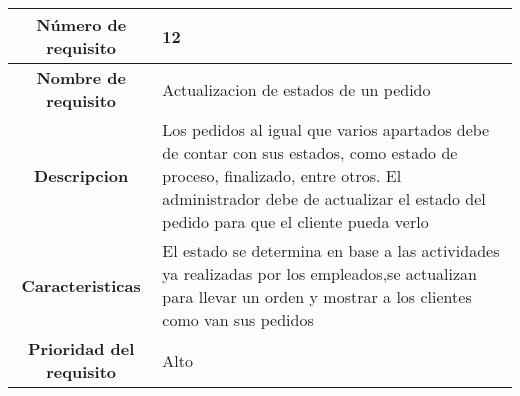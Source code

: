 \documentclass[12pt,a4paper, twosite]{article}
\begin{document}
\begin{center}
    \begin{tabular}{|c|p{6cm}|}
        \hline
        \textbf{Número de requisito} & 12 \\ 
        \hline
        \textbf{Nombre de requisito} & Actualizacion de estados de un pedido \\
        \hline
        \textbf{Descripcion} & Los pedidos al igual que varios apartados debe de contar con sus estados, como estado de proceso, finalizado, entre otros. El administrador debe de actualizar el estado del pedido para que el cliente pueda verlo \\
        \hline
        \textbf{Caracteristicas} & El estado se determina en base a las actividades ya realizadas por los empleados,se actualizan para llevar un orden y mostrar a los clientes como van sus pedidos \\
        \hline
        \textbf{Prioridad del requisito} & Alto \\
        \hline
     \end{tabular}
\end{center}
\end{document}
